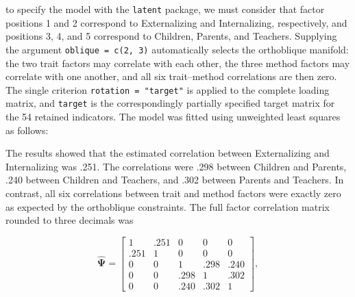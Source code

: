 \documentclass[
  12pt,
  letterpaper,
  article]{scrartcl}
\newenvironment{Shaded}{\begin{snugshade}}{\end{snugshade}}
\newcommand{\AttributeTok}[1]{\textcolor[rgb]{0.40,0.45,0.13}{#1}}
\newcommand{\CommentTok}[1]{\textcolor[rgb]{0.37,0.37,0.37}{#1}}
\newcommand{\DecValTok}[1]{\textcolor[rgb]{0.68,0.00,0.00}{#1}}
\newcommand{\FunctionTok}[1]{\textcolor[rgb]{0.28,0.35,0.67}{#1}}
\newcommand{\NormalTok}[1]{\textcolor[rgb]{0.00,0.23,0.31}{#1}}
\newcommand{\OtherTok}[1]{\textcolor[rgb]{0.00,0.23,0.31}{#1}}
\newcommand{\SpecialCharTok}[1]{\textcolor[rgb]{0.37,0.37,0.37}{#1}}
\newcommand{\StringTok}[1]{\textcolor[rgb]{0.13,0.47,0.30}{#1}}
\begin{document}
to specify the model with the \texttt{latent} package, we must consider
that factor positions 1 and 2 correspond to Externalizing and
Internalizing, respectively, and positions 3, 4, and 5 correspond to
Children, Parents, and Teachers. Supplying the argument
\texttt{oblique = c(2, 3)} automatically selects the orthoblique
manifold: the two trait factors may correlate with each other, the three
method factors may correlate with one another, and all six trait--method
correlations are then zero. The single criterion
\texttt{rotation = "target"} is applied to the complete loading matrix,
and \texttt{target} is the correspondingly partially specified target
matrix for the 54 retained indicators. The model was fitted using
unweighted least squares as follows:

\begin{Shaded}
\end{Shaded}

The results showed that the estimated correlation between Externalizing
and Internalizing was .251. The correlations were .298 between Children
and Parents, .240 between Children and Teachers, and .302 between
Parents and Teachers. In contrast, all six correlations between trait
and method factors were exactly zero as expected by the orthoblique
constraints. The full factor correlation matrix rounded to three
decimals was

\[
\widehat{\mathbf{\Psi}}
=\left[
\begin{array}{cc|ccc}
1     & .251 &    0 &    0 &    0 \\
.251 &     1 &    0 &    0 &    0 \\\hline
    0 &     0 &    1 & .298 & .240 \\
    0 &     0 & .298 &    1 & .302 \\
    0 &     0 & .240 & .302 &    1
\end{array}
\right],
\]
\end{document}

